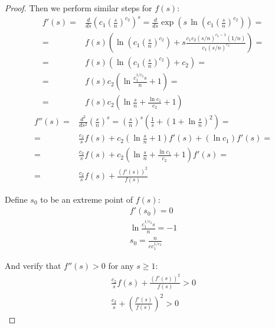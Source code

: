 \begin{proof}
    Then we perform similar steps for $f(s)$:
    \begin{equation}
        \begin{split}
            f'(s)=&\frac{d}{ds}\left(c_1\left(\frac{s}{n}\right)^{c_2}\right)^s
            =\frac{d}{ds}\exp\left(
                s\,
                \ln\left(c_1\left(\frac{s}{n}\right)^{c_2}\right)
            \right)=\\
            =&f(s)\left(
                \ln\left(c_1\left(\frac{s}{n}\right)^{c_2}\right)
                +s\frac{c_1c_2(s/n)^{c_2-1}(1/n)}{c_1(s/n)^{c_2}}
            \right)=\\
            =&f(s)\left(\ln\left(c_1\left(\frac{s}{n}\right)^{c_2}\right)+c_2\right)=\\
            =&f(s)c_2\left(\ln\frac{c_1^{1/c_2}s}{n}+1\right)=\\
            =&f(s)c_2\left(\ln\frac{s}{n}+\frac{\ln c_1}{c_2}+1\right)
        \end{split}
    \end{equation}
    \begin{equation}
        \begin{split}
            f''(s)=&\frac{d^2}{ds^2}\left(\frac{s}{n}\right)^s
            =\left(\frac{s}{n}\right)^s\left(\frac{1}{s}+\left(1+\ln\frac{s}{n}\right)^2\right)=\\
            =&\frac{c_2}{s}f(s)+c_2\left(\ln\frac{s}{n}+1\right)f'(s)+(\ln c_1)f'(s)=\\
            =&\frac{c_2}{s}f(s)+c_2\left(\ln\frac{s}{n}+\frac{\ln c_1}{c_2}+1\right)f'(s)=\\
            =&\frac{c_2}{s}f(s)+\frac{(f'(s))^2}{f(s)}
        \end{split}
    \end{equation}
    
    Define $s_0$ to be an extreme point of $f(s)$:
    \begin{gather}
        f'(s_0)=0\\
        \ln\frac{c_1^{1/c_2}s}{n}=-1\\
        s_0=\frac{n}{ec_1^{1/c_2}}
    \end{gather}
    
    And verify that $f''(s)>0$ for any $s\geq1$:
    \begin{gather}
        \frac{c_2}{s}f(s)+\frac{(f'(s))^2}{f(s)}>0\\
        \frac{c_2}{s}+\left(\frac{f'(s)}{f(s)}\right)^2>0
    \end{gather}
    

\end{proof}
